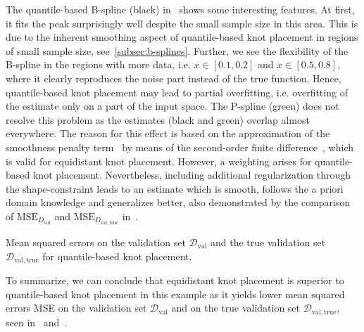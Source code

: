 The quantile-based B-spline (black) in~ shows some interesting features. At first, it fits the peak surprisingly well despite the small sample size in this area. This is due to the inherent smoothing aspect of quantile-based knot placement in regions of small sample size, see~\ref{subsec:b-splines}. Further, we see the flexibility of the B-spline in the regions with more data, i.e. $x\in[0.1,0.2]$ and $x \in [0.5,0.8]$, where it clearly reproduces the noise part instead of the true function. Hence, quantile-based knot placement may lead to partial overfitting, i.e. overfitting of the estimate only on a part of the input space. The P-spline (green) does not resolve this problem as the estimates (black and green) overlap almost everywhere. The reason for this effect is based on the approximation of the smoothness penalty term~ by means of the second-order finite difference~, which is valid for equidistant knot placement. However, a weighting arises for quantile-based knot placement. Nevertheless, including additional regularization through the shape-constraint leads to an estimate which is smooth, follows the a priori domain knowledge and generalizes better, also demonstrated by the comparison of $\text{MSE}_{D_{\mathrm{val}}}$ and $\text{MSE}_{D_{\mathrm{val}, \mathrm{true}}}$ in~.


\begin{table}[H]
	\begin{center}
	\end{center}
	\caption{Mean squared errors on the validation set $\mathcal{D}_{\mathrm{val}}$ and the true validation set $\mathcal{D}_{\mathrm{val},\mathrm{true}}$ for quantile-based knot placement.}
	\label{tab:sparse-example-quantile}
\end{table}
%
To summarize, we can conclude that equidistant knot placement is superior to quantile-based knot placement in this example as it yields lower mean squared errors MSE on the validation set $\mathcal{D}_{\mathrm{val}}$ and on the true validation set $\mathcal{D}_{\mathrm{val}, \mathrm{true}}$, seen in~ and~.

